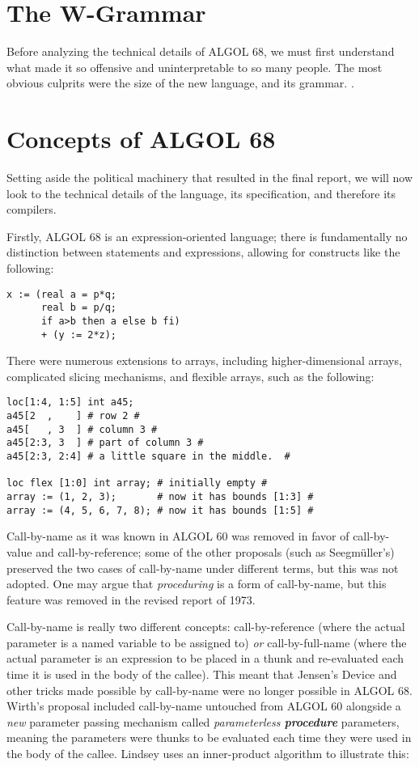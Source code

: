 \section{The W-Grammar}

Before analyzing the technical details of ALGOL 68, we must first understand
what made it so offensive and uninterpretable to so many people.
The most obvious culprits were the size of the new language, and its grammar.
.

\section{Concepts of ALGOL 68}

Setting aside the political machinery that resulted in the final report,
we will now look to the technical details of the language, its specification,
and therefore its compilers.

Firstly, ALGOL 68 is an expression-oriented language;
there is fundamentally no distinction between statements and expressions,
allowing for constructs like the following:

\begin{lstlisting}[language=algol,frame=single]
x := (real a = p*q;
      real b = p/q;
      if a>b then a else b fi)
      + (y := 2*z); 
\end{lstlisting}

There were numerous extensions to arrays, including higher-dimensional arrays,
complicated slicing mechanisms, and flexible arrays, such as the following:
\begin{lstlisting}[language=algol,frame=single]
loc[1:4, 1:5] int a45; 
a45[2  ,    ] # row 2 #
a45[   , 3  ] # column 3 #
a45[2:3, 3  ] # part of column 3 #
a45[2:3, 2:4] # a little square in the middle.  #

loc flex [1:0] int array; # initially empty #
array := (1, 2, 3);       # now it has bounds [1:3] #
array := (4, 5, 6, 7, 8); # now it has bounds [1:5] #
\end{lstlisting}

Call-by-name as it was known in ALGOL 60 was removed in favor of
call-by-value and call-by-reference; some of the other proposals
(such as Seegm{\"u}ller's) preserved the two cases of call-by-name
under different terms, but this was not adopted.
One may argue that \textit{proceduring} is a form of call-by-name,
but this feature was removed in the revised report of 1973.

Call-by-name is really two different concepts:
call-by-reference (where the actual parameter is a named variable to
be assigned to) \textit{or} call-by-full-name (where the actual parameter
is an expression to be placed in a thunk and re-evaluated each time
it is used in the body of the callee). This meant that Jensen's Device
and other tricks made possible by call-by-name were no longer possible
in ALGOL 68.
Wirth's proposal included call-by-name untouched from ALGOL 60 alongside
a \textit{new} parameter passing mechanism called \textit{parameterless \textbf{procedure}}
parameters, meaning the parameters were thunks to be evaluated each time they
were used in the body of the callee\cite{a_history_of_algol_68_1993}.
Lindsey uses an inner-product algorithm to illustrate this:

